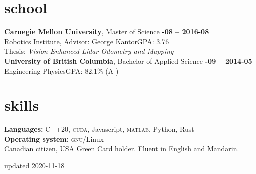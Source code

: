 \documentclass[margin,10pt]{res}
\begin{document}
\begin{resume}
\section{\sc \lsstyle school}
    \textbf{Carnegie Mellon University}, Master of Science \hfill \textsc{\bfseries{}-08 -- 2016-08}\\
    Robotics Institute, Advisor: George Kantor\hfill GPA: 3.76\\
    Thesis: \textit{Vision-Enhanced Lidar Odometry and Mapping}\vspace{3pt}\\
    \textbf{University of British Columbia}, Bachelor of Applied Science \hfill \textsc{\bfseries{}-09 -- 2014-05}\\
    Engineering Physics\hfill GPA: 82.1\% (A-)%
\section{\sc \lsstyle skills}
    \textbf{Languages:}
    C++20, \textsc{cuda}, Javascript, \textsc{matlab}, Python, Rust \\
    \textbf{Operating system:} \textsc{gnu}/Linux\\
    Canadian citizen, USA Green Card holder. Fluent in English and Mandarin.\\
\end{resume}
\begin{minipage}[t]{\textwidth}
    \flushright
    \small
    \sc \lsstyle
    \hfill updated 2020-11-18
\end{minipage}
\end{document}
